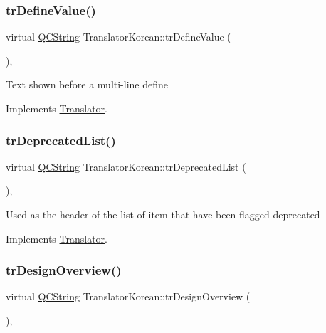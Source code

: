 \subsubsection{\texorpdfstring{trDefineValue()}{trDefineValue()}}
{\footnotesize\ttfamily virtual \mbox{\hyperlink{class_q_c_string}{Q\+C\+String}} Translator\+Korean\+::tr\+Define\+Value (\begin{DoxyParamCaption}{ }\end{DoxyParamCaption})\hspace{0.3cm}{\ttfamily [inline]}, {\ttfamily [virtual]}}

Text shown before a multi-\/line define 

Implements \mbox{\hyperlink{class_translator}{Translator}}.

\mbox{\label{class_translator_korean_a4ae1b349f783775530cb0f8850ec9511}} 
\subsubsection{\texorpdfstring{trDeprecatedList()}{trDeprecatedList()}}
{\footnotesize\ttfamily virtual \mbox{\hyperlink{class_q_c_string}{Q\+C\+String}} Translator\+Korean\+::tr\+Deprecated\+List (\begin{DoxyParamCaption}{ }\end{DoxyParamCaption})\hspace{0.3cm}{\ttfamily [inline]}, {\ttfamily [virtual]}}

Used as the header of the list of item that have been flagged deprecated 

Implements \mbox{\hyperlink{class_translator}{Translator}}.

\mbox{\label{class_translator_korean_a8bb98b800296c28e2693e6c472ed4012}} 
\subsubsection{\texorpdfstring{trDesignOverview()}{trDesignOverview()}}
{\footnotesize\ttfamily virtual \mbox{\hyperlink{class_q_c_string}{Q\+C\+String}} Translator\+Korean\+::tr\+Design\+Overview (\begin{DoxyParamCaption}{ }\end{DoxyParamCaption})\hspace{0.3cm}{\ttfamily [inline]}, {\ttfamily [virtual]}}

